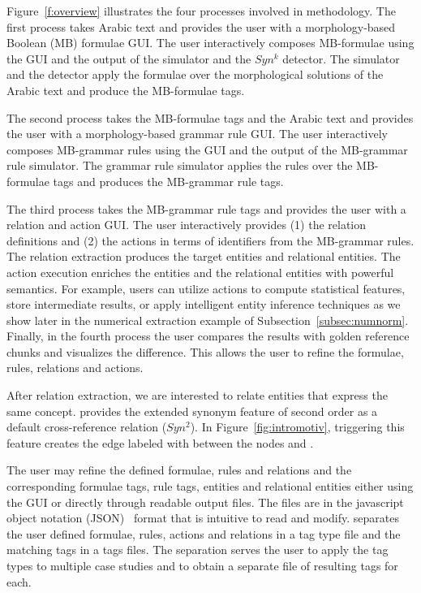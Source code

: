 

Figure~\ref{f:overview} illustrates the four processes involved in \framework methodology. 
The first process takes Arabic text and provides the user 
with a morphology-based Boolean (MB) formulae GUI. 
The user interactively composes MB-formulae using the GUI and the output 
of the simulator and the $Syn^k$ detector. 
The simulator and the detector apply the formulae over the morphological solutions 
of the Arabic text and produce the MB-formulae tags. 

The second process takes the MB-formulae tags and the Arabic text and provides
the user with a morphology-based grammar rule GUI. 
The user interactively composes MB-grammar rules using the GUI and the output 
of the MB-grammar rule simulator. 
The grammar rule simulator applies the rules over the MB-formulae tags and 
produces the MB-grammar rule tags. 

The third process takes the MB-grammar rule tags and provides the user with 
a relation and action GUI. 
The user interactively provides (1) the relation definitions and 
(2) the actions in terms of identifiers from the MB-grammar 
rules.
The relation extraction produces the target entities and relational
entities. 
The action execution enriches the entities and the relational entities
with powerful semantics.
For example, users can utilize actions to compute statistical features, 
store intermediate results, 
or apply intelligent entity inference techniques
as we show later in the numerical extraction example of 
Subsection~\ref{subsec:numnorm}.
%
Finally, in the fourth process the user compares the results with golden
reference chunks and visualizes the difference. 
This allows the user to refine the formulae, rules, relations and actions. 

After relation extraction, we are interested to relate 
entities that express the same concept.
\framework provides the extended synonym feature of second order as 
a default cross-reference relation ($Syn^2$).
In Figure~\ref{fig:intromotiv}, triggering this feature creates the 
edge labeled with  
between the nodes  and .

The user may refine the defined formulae, rules and relations and 
the corresponding formulae tags, rule tags, entities and relational entities
either using the GUI or directly through readable output files.
The files are in the javascript object notation (JSON)~\cite{nolan2014javascript} 
format that is intuitive to read and modify.
\framework separates the user defined formulae, rules, actions and relations in
a \framework tag type file and the 
matching tags in a tags files.
The separation serves the user to apply the tag types to multiple case studies 
and to obtain a separate file of resulting tags for each. 